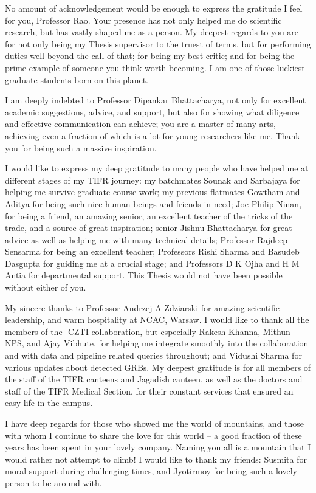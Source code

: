 No amount of acknowledgement would be enough to express the gratitude I feel for you, Professor Rao. Your presence has not only helped me do scientific research, but has vastly shaped me as a person. My deepest regards to you are for not only being my Thesis supervisor to the truest of terms, but for performing duties well beyond the call of that; for being my best critic; and for being the prime example of someone you think worth becoming. I am one of those luckiest graduate students born on this planet.

I am deeply indebted to Professor Dipankar Bhattacharya, not only for excellent academic suggestions, advice, and support, but also for showing what diligence and effective communication can achieve; you are a master of many arts, achieving even a fraction of which is a lot for young researchers like me. Thank you for being such a massive inspiration.

I would like to express my deep gratitude to many people who have helped me at different stages of my TIFR journey: my batchmates Sounak and Sarbajaya for helping me survive graduate course work; my previous flatmates Gowtham and Aditya for being such nice human beings and friends in need; Joe Philip Ninan, for being a friend, an amazing senior, an excellent teacher of the tricks of the trade, and a source of great inspiration; senior Jishnu Bhattacharya for great advice as well as helping me with many technical details; Professor Rajdeep Sensarma for being an excellent teacher; Professors Rishi Sharma and Basudeb Dasgupta for guiding me at a crucial stage; and Professors D K Ojha and H M Antia for departmental support. This Thesis would not have been possible without either of you.

My sincere thanks to Professor Andrzej A Zdziarski for amazing scientific leadership, and warm hospitality at NCAC, Warsaw. I would like to thank all the members of the \AS -CZTI collaboration, but especially Rakesh Khanna, Mithun NPS, and Ajay Vibhute, for helping me integrate smoothly into the collaboration and with data and pipeline related queries throughout; and Vidushi Sharma for various updates about detected GRBs. My deepest gratitude is for all members of the staff of the TIFR canteens and Jagadish canteen, as well as the doctors and staff of the TIFR Medical Section, for their constant services that ensured an easy life in the campus.

I have deep regards for those who showed me the world of mountains, and those with whom I continue to share the love for this world -- a good fraction of these years has been spent in your lovely company. Naming you all is a mountain that I would rather not attempt to climb! I would like to thank my friends: Susmita for moral support during challenging times, and Jyotirmoy for being such a lovely person to be around with.

